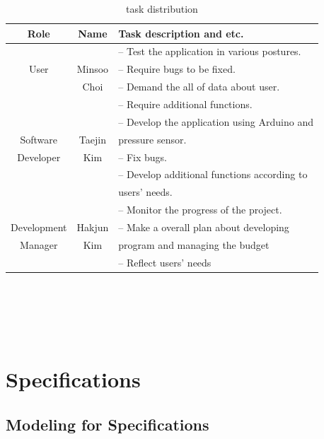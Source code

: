 \documentclass[conference]{IEEEtran}
\begin{document}
\begin{table}[H]
\caption{task distribution}
\begin{tabular}{|c|c|l|}\hline
Role & Name & Task description and etc.\\ \hline \hline

&  &  -- Test the application in various postures. \\ 

User & Minsoo & -- Require bugs to be fixed.  \\ 

& Choi & -- Demand the all of data about user. \\ 

&  & -- Require additional functions. \\ \hline

&  &  -- Develop the application using Arduino and\\ 

Software & Taejin & pressure sensor. \\ 

Developer & Kim & -- Fix bugs. \\ 

&  & -- Develop additional functions according to\\ 

&  & users' needs. \\ \hline

&  &  -- Monitor the progress of the project. \\ 

Development & Hakjun & -- Make a overall plan about developing \\ 

Manager& Kim & program and managing the budget \\ 

&  & -- Reflect users' needs \\ \hline

\end{tabular}\\\\\\\\

\end{table}

\section{Specifications}

\subsection{Modeling for Specifications \\}
\end{document}
